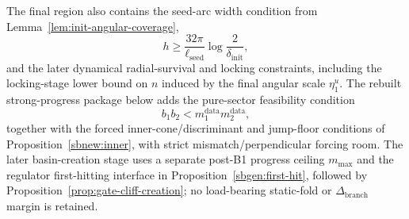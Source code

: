 \documentclass{article} %
\theoremstyle{plain}
\theoremstyle{definition}
\theoremstyle{remark}
\begin{document}
The final region also contains the seed-arc width condition from
Lemma~\ref{lem:init-angular-coverage},
\[
\boxed{
h
\ge
\frac{32\pi}{\ell_{\mathrm{seed}}}
\log\frac{2}{\delta_{\mathrm{init}}},
}
\]
and the later dynamical radial-survival and locking constraints, including
the locking-stage lower bound on $n$ induced by the final angular scale
$\eta_1^u$.  The rebuilt strong-progress package below adds the pure-sector
feasibility condition
\[
b_1b_2<m_1^{\mathrm{data}}m_2^{\mathrm{data}},
\]
together with the forced inner-cone/discriminant and jump-floor conditions of
Proposition~\ref{sbnew:inner}, with strict mismatch/perpendicular forcing
room.  The later basin-creation stage uses a separate post-B1 progress
ceiling $m_{\max}$ and the regulator first-hitting interface in
Proposition~\ref{sbgen:first-hit}, followed by
Proposition~\ref{prop:gate-cliff-creation}; no load-bearing static-fold or
$\Delta_{\mathrm{branch}}$ margin is retained.


\end{document}
